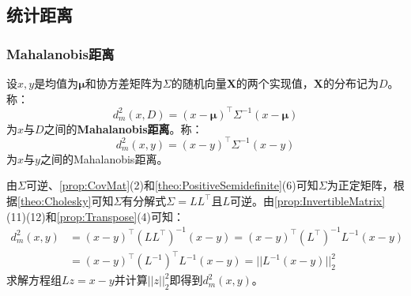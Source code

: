 \subsection{统计距离}
\subsubsection{Mahalanobis距离}
\begin{definition}
	设$x,y$是均值为$\boldsymbol{\mu}$和协方差矩阵为$\Sigma$的随机向量$\mathbf{X}$的两个实现值，$\mathbf{X}$的分布记为$D$。称：
	\begin{equation*}
		d^2_m(x,D)=(x-\boldsymbol{\mu})^{\top}\Sigma^{-1}(x-\boldsymbol{\mu})
	\end{equation*}
	为$x$与$D$之间的\textbf{Mahalanobis距离}。称：
	\begin{equation*}
		d^2_m(x,y)=(x-y)^{\top}\Sigma^{-1}(x-y)
	\end{equation*}
	为$x$与$y$之间的Mahalanobis距离。
\end{definition}
\begin{method}
	由$\Sigma$可逆、\cref{prop:CovMat}(2)和\cref{theo:PositiveSemidefinite}(6)可知$\Sigma$为正定矩阵，根据\cref{theo:Cholesky}可知$\Sigma$有分解式$\Sigma=LL^{\top}$且$L$可逆。由\cref{prop:InvertibleMatrix}(11)(12)和\cref{prop:Transpose}(4)可知：
	\begin{align*}
		d^2_m(x,y)&=(x-y)^{\top}(LL^{\top})^{-1}(x-y)=(x-y)^{\top}(L^{\top})^{-1}L^{-1}(x-y) \\
		&=(x-y)^{\top}(L^{-1})^{\top}L^{-1}(x-y)=||L^{-1}(x-y)||_2^2
	\end{align*}
	求解方程组$Lz=x-y$并计算$||z||_2^2$即得到$d^2_m(x,y)$。
\end{method}
